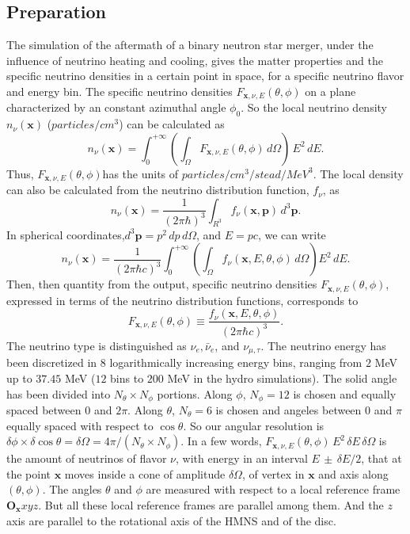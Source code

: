 \documentclass[
reprint,
preprintnumbers,
 amsmath,
 amssymb,
 aps,
onecolumn,
prd,
]{revtex4-2}
\begin{document}
\subsection{\label{sec20u}Preparation}
The simulation of the aftermath of a binary neutron star merger, under the influence of neutrino heating and cooling, gives the matter properties and the specific neutrino densities in a certain point in space, for a specific neutrino flavor and energy bin.
The specific neutrino densities $F_{\mathbf{x}, \nu, E}(\theta, \phi)$ on a plane characterized by an constant azimuthal angle $\phi_0$. So the local neutrino density $n_\nu(\mathbf{x})$ ($particles/cm^3$) can be calculated as
\begin{equation}
n_\nu(\mathbf{x})=
\int_0^{+\infty}\left(\int_\Omega F_{\mathbf{x}, \nu, E}(\theta, \phi)\,d\Omega \right)\,E^2\,dE.
\label{eq:localDensityOfSpecificNeutinoDensities}
\end{equation}
Thus, $F_{\mathbf{x}, \nu, E}(\theta, \phi)$has the units of $particles/cm^3/stead/MeV^3$. The local density can also be calculated from the neutrino distribution function, $f_\nu$, as
\begin{equation}
n_\nu(\mathbf{x})=\frac{1}{\left(2\pi\hbar\right)^3}\int_{R^3} f_\nu(\mathbf{x}, \mathbf{p})\,d^3\mathbf{p}.\label{eq:localDensitiesOfDistribution}
\end{equation}
In spherical coordinates,$d^3\mathbf{p}=p^2\,dp\,d\Omega$, and $E=pc$, we can write
\begin{equation}
n_\nu{\left(\mathbf{x}\right)}=\frac{1}{(2\pi\hbar c)^3}\int_0^{+\infty}\left(\int_\Omega f_\nu(\mathbf{x},E,\theta,\phi)\,d\Omega\right)E^2\,dE.
\end{equation}
Then, then quantity from the output, specific neutrino densities $F_{\mathbf{x},\nu,E}(\theta,\phi)$, expressed in terms of the neutrino distribution functions, corresponds to 
\begin{equation}
F_{\mathbf{x},\nu,E}(\theta,\phi) \equiv \frac{f_\nu(\mathbf{x},E,\theta,\phi)}{(2\pi\hbar c)^3}.
\end{equation}
The neutrino type is distinguished as $\nu_e,\bar{\nu}_e$, and $\nu_{\mu,\tau}$. The neutrino energy has been discretized in 8 logarithmically increasing energy bins, ranging from $2$ MeV up to $37.45$ MeV ($12$ bins to $200$ MeV in the hydro simulations). The solid angle has been divided into $N_\theta \times N_\phi$ portions. Along $\phi$, $N_\phi=12$ is chosen and equally spaced between $0$ and $2\pi$. Along $\theta$, $N_\theta=6$ is chosen and angeles between	 $0$ and $\pi$ equally spaced with respect to $\cos \theta$. So our angular resolution is $\delta \phi \times \delta \cos \theta =\delta \Omega =4\pi/(N_\theta\times N_\phi)$. In a few words, $F_{\mathbf{x},\nu,E}(\theta,\phi)\,E^2 \,\delta E\,\delta\Omega$ is the amount of neutrinos of flavor $\nu$, with energy in an interval $E\,\pm\,\delta E/2$, that at the point $\mathbf{x}$ moves inside a cone of amplitude $\delta\Omega$, of vertex in $\mathbf{x}$ and axis along $(\theta, \phi)$. The angles $\theta$ and $\phi$ are measured with respect to a local reference frame $\mathbf{O}_{\mathbf{x}}xyz$. But all these local reference frames are parallel among them. And the $z$ axis are parallel to the rotational axis of the HMNS and of the disc.
\end{document}
